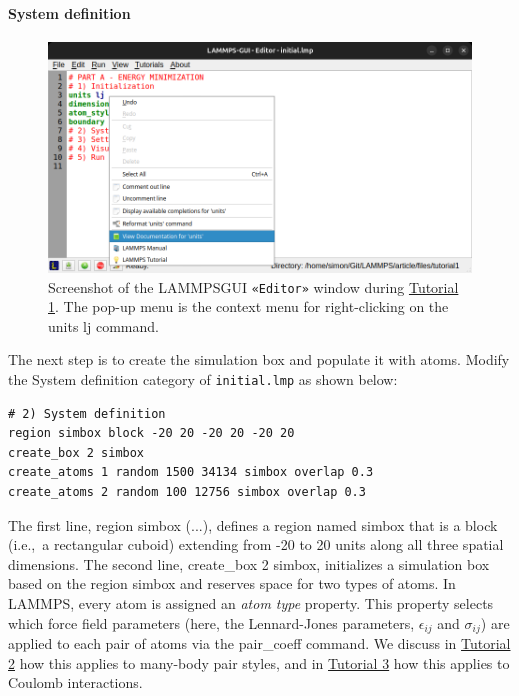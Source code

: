 \documentclass[9pt,tutorial]{livecoms}
\newcommand{\lmpcmd}[1]{\hspace{0pt}\colorbox{listing}{\textcolor{command}{\small{#1}}}\hspace{0pt}} %
\newcommand{\flecmd}[1]{\textcolor{command}{\texttt{#1}}} %
\newcommand{\guicmd}[1]{\textcolor{command}{\texttt{«#1»}}} %
\newcommand{\lammpsgui}{\textsf{LAMMPS\textendash GUI}}
\begin{document}
\paragraph{System definition}

\begin{figure}
\centering
\includegraphics[width=\linewidth]{GUI-1.png}
\caption{Screenshot of the \lammpsgui{} \guicmd{Editor} window during
  \hyperref[lennard-jones-label]{Tutorial 1}.  The pop-up menu is the
  context menu for right-clicking on the \lmpcmd{units lj} command.}
\label{fig:GUI-1}
\end{figure}

The next step is to create the simulation box and populate it with
atoms.  Modify the \lmpcmd{System definition} category of
\flecmd{initial.lmp} as shown below:
\begin{lstlisting}
# 2) System definition
region simbox block -20 20 -20 20 -20 20
create_box 2 simbox
create_atoms 1 random 1500 34134 simbox overlap 0.3
create_atoms 2 random 100 12756 simbox overlap 0.3
\end{lstlisting}
The first line, \lmpcmd{region simbox (...)}, defines a region named
\lmpcmd{simbox} that is a block (i.e.,~a rectangular cuboid) extending
from -20 to 20 units along all three spatial dimensions.  The second
line, \lmpcmd{create\_box 2 simbox}, initializes a simulation box based
on the region \lmpcmd{simbox} and reserves space for two types of atoms.
{\color{blue}In LAMMPS, every atom is assigned an \emph{atom type}
  property.  This property selects which force field parameters (here,
  the Lennard-Jones parameters, $\epsilon_{ij}$ and $\sigma_{ij}$) are
  applied to each pair of atoms via the \lmpcmd{pair\_coeff} command.
  We discuss in \hyperref[carbon-nanotube-label]{Tutorial 2} how this
  applies to many-body pair styles, and in
  \hyperref[all-atom-label]{Tutorial 3} how this applies to Coulomb
  interactions.}
\end{document}
